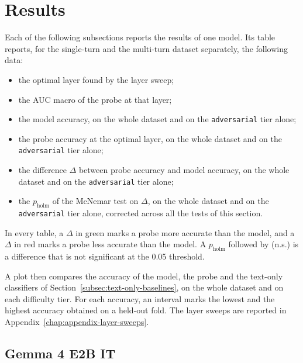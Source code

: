\section{Results}
\label{sec:ch7-results}

\newcommand{\rgain}[1]{%
    \ifdim #1 pt < 0pt
        \textcolor{ch7loss}{#1}%
    \else
        \textcolor{ch7gain}{+#1}%
    \fi
}
\newcommand{\pns}[1]{#1 (n.s.)}

Each of the following subsections reports the results of one model. Its table reports, for the single-turn and the multi-turn dataset separately, the following data:

\begin{itemize}
    \item the optimal layer found by the layer sweep;
    \item the AUC macro of the probe at that layer;
    \item the model accuracy, on the whole dataset and on the \texttt{adversarial} tier alone;
    \item the probe accuracy at the optimal layer, on the whole dataset and on the \texttt{adversarial} tier alone;
    \item the difference $\Delta$ between probe accuracy and model accuracy, on the whole dataset and on the \texttt{adversarial} tier alone;
    \item the $p_{\text{holm}}$ of the McNemar test on $\Delta$, on the whole dataset and on the \texttt{adversarial} tier alone, corrected across all the tests of this section.
\end{itemize}

In every table, a $\Delta$ in \textcolor{ch7gain}{green} marks a probe more accurate than the model, and a $\Delta$ in \textcolor{ch7loss}{red} marks a probe less accurate than the model. A $p_{\text{holm}}$ followed by (n.s.) is a difference that is not significant at the 0.05 threshold.

A plot then compares the accuracy of the model, the probe and the text-only classifiers of Section~\ref{subsec:text-only-baselines}, on the whole dataset and on each difficulty tier. For each accuracy, an interval marks the lowest and the highest accuracy obtained on a held-out fold. The layer sweeps are reported in Appendix~\ref{chap:appendix-layer-sweeps}.

\subsection{Gemma 4 E2B IT}
\label{subsec:ch7-gemma4-e2b-it}

